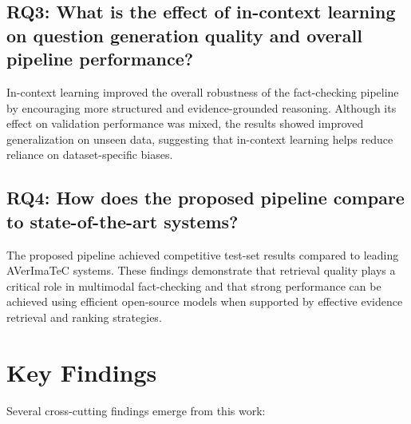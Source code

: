 \subsection*{RQ3: What is the effect of in-context learning on question generation quality and overall pipeline performance?}

In-context learning improved the overall robustness of the fact-checking pipeline by encouraging more structured and evidence-grounded reasoning. Although its effect on validation performance was mixed, the results showed improved generalization on unseen data, suggesting that in-context learning helps reduce reliance on dataset-specific biases.

\subsection*{RQ4: How does the proposed pipeline compare to state-of-the-art systems?}

The proposed pipeline achieved competitive test-set results compared to leading AVerImaTeC systems. These findings demonstrate that retrieval quality plays a critical role in multimodal fact-checking and that strong performance can be achieved using efficient open-source models when supported by effective evidence retrieval and ranking strategies.

\section{Key Findings}

Several cross-cutting findings emerge from this work:

